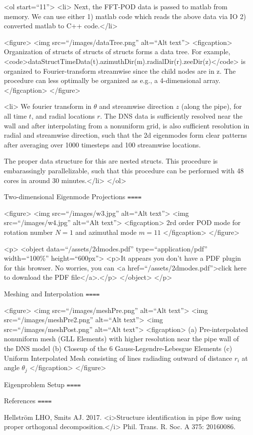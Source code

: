 \documentclass[11pt]{article}
\begin{document}
<ol start=``11''>
<li> Next, the FFT-POD data is passed to matlab from memory. We can use either 1) matlab code which reads the above data via IO 2) converted matlab to C++ code.</li>



<figure>
  <img src=``/images/dataTree.png'' alt=``Alt text''>
  <figcaption> Organization of structs of structs of structs forms a data tree. 
   For example, <code>dataStructTimeData(t).azimuthDir(m).radialDir(r).zeeDir(z)</code> is organized to Fourier-transform streamwise since the child nodes are in z. The procedure can less optimally be organized as e.g., a 4-dimensional array.
</figcaption>
</figure>



<li>  We fourier transform in \(\theta\) and streamwise direction \(z\) (along the pipe), for all time \(t\), and radial locations \(r\). The DNS data is sufficiently resolved near the wall and after interpolating from a nonuniform grid, is also sufficient resolution in radial and streamwise direction, such that the 2d eigenmodes form clear patterns after averaging over 1000 timesteps and 100 streamwise locations. 

The proper data structure for this are nested structs. This procedure is embarassingly parallelizable, such that this procedure can be performed with 48 cores in around 30 minutes.</li>
</ol>

Two-dimensional Eigenmode Projections
\texttt{====}

<figure>
  <img src=``/images/w3.jpg'' alt=``Alt text''>
  <img src=``/images/w4.jpg'' alt=``Alt text''>
  <figcaption>
2rd order POD mode for rotation number \(N=1\) and azimuthal mode \(m=11\)
</figcaption>
</figure>



<p>
<object data=``/assets/2dmodes.pdf'' type=``application/pdf'' width=``100\%'' height=``600px''>
  <p>It appears you don't have a PDF plugin for this browser. No worries, you can <a href=``/assets/2dmodes.pdf''>click here to download the PDF file</a>.</p>
</object> </p>

Meshing and Interpolation 
\texttt{====}

<figure>
  <img src=``/images/meshPre.png'' alt=``Alt text''>
  <img src=``/images/meshPre2.png'' alt=``Alt text''>
  <img src=``/images/meshPost.png'' alt=``Alt text''>
  <figcaption>
(a) Pre-interpolated nonuniform mesh (GLL Elements) with higher resolution near the pipe wall of the DNS model
(b) Closeup of the 6 Gauss-Legendre-Lebesgue Elements 
(c) Uniform Interpolated Mesh consisting of lines radiading outward of distance \(r_i\) at angle \(\theta_j\)
</figcaption>
</figure>

Eigenproblem Setup
\texttt{====}



References
\texttt{====}

Hellström LHO, Smits AJ. 2017. <i>Structure identification in pipe flow using proper orthogonal decomposition.</i> Phil. Trans. R. Soc. A 375: 20160086.
\end{document}
